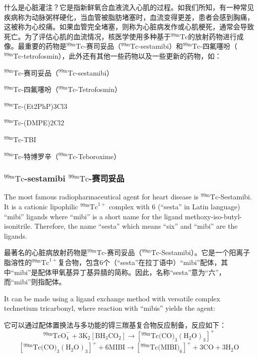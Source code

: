 \documentclass[dvipsnames, svgnames,a4paper,11pt]{article}
\begin{document}
什么是心脏灌注？它是指新鲜氧合血液流入心肌的过程。如我们所知，有一种常见疾病称为动脉粥样硬化，当血管被脂肪堵塞时，血流变得更差，患者会感到胸痛，这被称为心绞痛。如果血管完全堵塞，则称为心脏病发作或心肌梗死，通常会导致死亡。为了评估心肌的血流情况，核医学使用多种基于${}^\mathrm{99m}\mathrm{Tc}$的放射药物进行成像。最重要的药物是${}^\mathrm{99m}\mathrm{Tc}$-赛司妥品（${}^\mathrm{99m}\mathrm{Tc}$-sestamibi）和${}^\mathrm{99m}\mathrm{Tc}$-四氟噻吩（${}^\mathrm{99m}\mathrm{Tc}$-tetrofosmin），此外还有其他一些药物以及一些更新的药物，如：

${}^\mathrm{99m}\mathrm{Tc}$-赛司妥品（${}^\mathrm{99m}\mathrm{Tc}$-sestamibi）

${}^\mathrm{99m}\mathrm{Tc}$-四氟噻吩（${}^\mathrm{99m}\mathrm{Tc}$-Tetrofosmin）

${}^\mathrm{99m}\mathrm{Tc}$-(Et2PhP)3Cl3

${}^\mathrm{99m}\mathrm{Tc}$-(DMPE)2Cl2

${}^\mathrm{99m}\mathrm{Tc}$-TBI

${}^\mathrm{99m}\mathrm{Tc}$-特博罗辛（${}^\mathrm{99m}\mathrm{Tc}$-Teboroxime）

\subsubsection{${}^\mathrm{99m}\mathrm{Tc}$-sestamibi ${}^\mathrm{99m}\mathrm{Tc}$-赛司妥品}
The most famous radiopharmaceutical agent for heart disease is ${}^\mathrm{99m}\mathrm{Tc}$-Sestamibi. It
is a cationic lipophilic ${}^\mathrm{99m}\mathrm{Tc}^{1+}$ complex with 6 (“sesta” in Latin language) “mibi”
ligands where “mibi” is a short name for the ligand methoxy-iso-butyl-isonitrile.
Therefore, the name “sesta” which means “six” and “mibi” are the ligands.

最著名的心脏病放射药物是${}^\mathrm{99m}\mathrm{Tc}$-赛司妥品（${}^\mathrm{99m}\mathrm{Tc}$-Sestamibi）。它是一个阳离子脂溶性的${}^\mathrm{99m}\mathrm{Tc}^{1+}$复合物，包含6个（“sesta”在拉丁语中）“mibi”配体，其中“mibi”是配体甲氧基异丁基异腈的简称。因此，名称“sesta”意为“六”，而“mibi”则指配体。

It can be made using a ligand exchange method with versatile complex technetium
tricarbonyl, where reaction with “mibis” yields the agent:

它可以通过配体置换法与多功能的锝三羰基复合物反应制备，反应如下： 
$$\text{${}^\mathrm{99m}\mathrm{Tc}$O}_4^- + 3\text{K}_2[\text{BH}_3\text{CO}_2]  \rightarrow [\text{${}^\mathrm{99m}\mathrm{Tc}$(CO)}_3(\text{H}_2\text{O})_3]^+ $$
$$[\text{${}^\mathrm{99m}\mathrm{Tc}$(CO)}_3(\text{H}_2\text{O})_3]^+ + 6\text{MIBI}  \rightarrow [\text{${}^\mathrm{99m}\mathrm{Tc}$(MIBI)}_6]^+ + 3\text{CO} + 3\text{H}_2\text{O}$$
\end{document}
